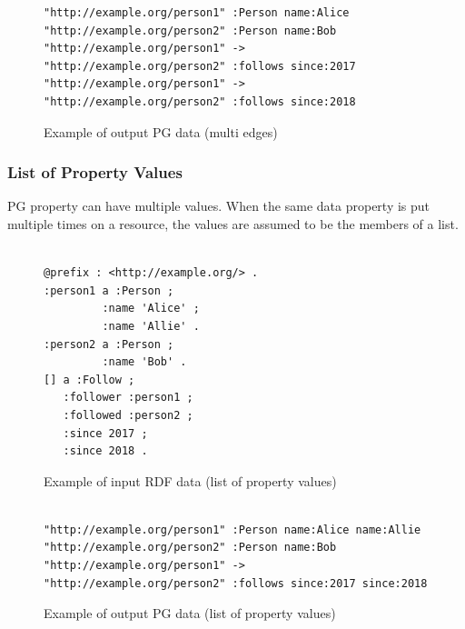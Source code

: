 \documentclass[runningheads]{llncs}
\begin{document}
\begin{figure}[!t]
\begin{scriptsize}
\begin{verbatim}
"http://example.org/person1" :Person name:Alice
"http://example.org/person2" :Person name:Bob
"http://example.org/person1" -> "http://example.org/person2" :follows since:2017
"http://example.org/person1" -> "http://example.org/person2" :follows since:2018
\end{verbatim}
\end{scriptsize}
\caption{Example of output PG data (multi edges)}
\label{fig:example-pg2}
\end{figure}

\subsubsection{List of Property Values}
PG property can have multiple values. When the same data property is put multiple times on a resource, the values are assumed to be the members of a list.

\begin{figure}[!t]
\begin{scriptsize}
\begin{verbatim}

@prefix : <http://example.org/> .
:person1 a :Person ;
         :name 'Alice' ;
         :name 'Allie' .
:person2 a :Person ;
         :name 'Bob' .
[] a :Follow ;
   :follower :person1 ;
   :followed :person2 ;
   :since 2017 ;
   :since 2018 .

\end{verbatim}
\end{scriptsize}
\caption{Example of input RDF data (list of property values)}
\label{fig:example-rdf3}
\end{figure}


\begin{figure}[!t]
\begin{scriptsize}
\begin{verbatim}

"http://example.org/person1" :Person name:Alice name:Allie
"http://example.org/person2" :Person name:Bob
"http://example.org/person1" -> "http://example.org/person2" :follows since:2017 since:2018

\end{verbatim}
\end{scriptsize}
\caption{Example of output PG data (list of property values)}
\label{fig:example-pg3}
\end{figure}
\end{document}
